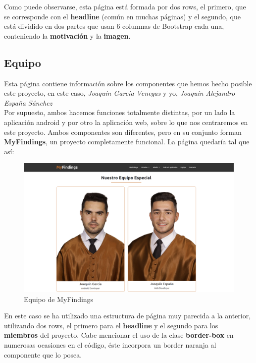     Como puede observarse, esta página está formada por dos rows, el primero, que se
    corresponde con el \textbf{headline} (común en muchas páginas) y el segundo, que está
    dividido en dos partes que usan 6 columnas de Bootstrap cada una, conteniendo la
    \textbf{motivación} y la \textbf{imagen}.

    \subsection{Equipo}
    Esta página contiene información sobre los componentes que hemos hecho posible este
    proyecto, en este caso, \textit{Joaquín García Venegas} y yo, \textit{Joaquín
    Alejandro España Sánchez}\\
    
    Por supuesto, ambos hacemos funciones totalmente distintas, por un lado la aplicación
    android y por otro la aplicación web, sobre lo que nos centraremos en este proyecto.
    Ambos componentes son diferentes, pero en su conjunto forman \textbf{MyFindings},
    un proyecto completamente funcional. La página quedaría tal que así:

        \begin{figure}[H]
            \centering
            \includegraphics[scale=0.20]{imagenes/team.png}
            \caption{Equipo de MyFindings}
            \label{fig:team}
        \end{figure}

    En este caso se ha utilizado una estructura de página muy parecida a la anterior, utilizando
    dos rows, el primero para el \textbf{headline} y el segundo para los \textbf{miembros} del
    proyecto. Cabe mencionar el uso de la clase \textbf{border-box} en numerosas ocasiones en 
    el código, éste incorpora un border naranja al componente que lo posea.

